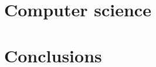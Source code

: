 \documentclass[ twoside,openright,titlepage,numbers=noenddot,headinclude,%
                footinclude=true,cleardoublepage=empty,abstractoff, %
                BCOR=5mm,paper=a4,fontsize=11pt,%
                ngerman,american,%
                ]{scrreprt}
\begin{document}
    \ctparttext{}
    \part{Computer science}
    
    
    
    
    
    
    \ctparttext{}
    \part{Conclusions}

    \cleardoublepage


   \cleardoublepage
   \cleardoublepage
   \cleardoublepage

    
\end{document}
